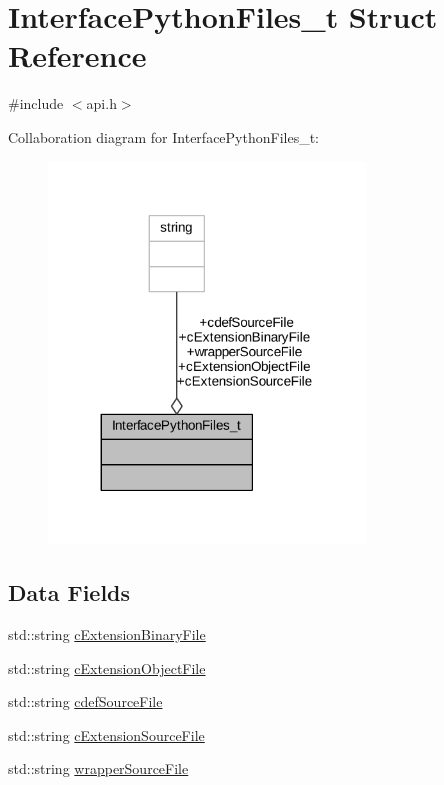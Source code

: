 \hypertarget{struct_interface_python_files__t}{}\section{Interface\+Python\+Files\+\_\+t Struct Reference}
\label{struct_interface_python_files__t}


{\ttfamily \#include $<$api.\+h$>$}



Collaboration diagram for Interface\+Python\+Files\+\_\+t\+:
\nopagebreak
\begin{figure}[H]
\begin{center}
\leavevmode
\includegraphics[width=239pt]{struct_interface_python_files__t__coll__graph}
\end{center}
\end{figure}
\subsection*{Data Fields}
\begin{DoxyCompactItemize}
\item 
std\+::string \hyperlink{struct_interface_python_files__t_ae44a7b6a26b05dd18b213fd21018cef0}{c\+Extension\+Binary\+File}
\item 
std\+::string \hyperlink{struct_interface_python_files__t_af47fd2343ee14b4b607b684097bd8163}{c\+Extension\+Object\+File}
\item 
std\+::string \hyperlink{struct_interface_python_files__t_a3d9264153ca1f9e694e45ed5678a2984}{cdef\+Source\+File}
\item 
std\+::string \hyperlink{struct_interface_python_files__t_a7a637eeb540e016f140556c198f94084}{c\+Extension\+Source\+File}
\item 
std\+::string \hyperlink{struct_interface_python_files__t_a789df0179efd6f99a3b21e8c8c8cbc09}{wrapper\+Source\+File}
\end{DoxyCompactItemize}



